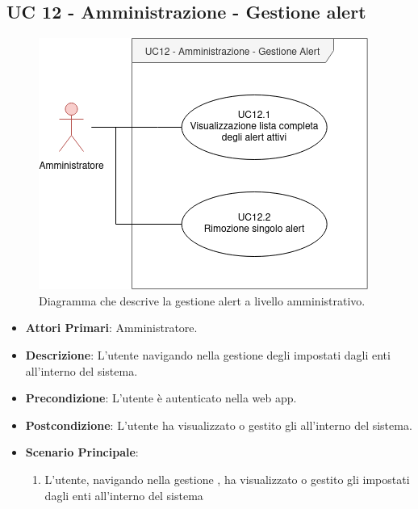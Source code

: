 	\subsection{UC 12 - Amministrazione - Gestione alert}

		\begin{figure}[H]
			\centering
			\includegraphics[scale=0.60]{res/images/uc12}
			\caption{Diagramma che descrive la gestione alert a livello amministrativo.}
		\end{figure}

		\begin{itemize}
			\item \textbf{Attori Primari}: Amministratore.
			\item \textbf{Descrizione}: L'utente navigando nella gestione degli  impostati dagli enti all'interno del sistema.
			\item \textbf{Precondizione}: L'utente è autenticato nella web app.
			\item \textbf{Postcondizione}: L'utente ha visualizzato o gestito gli  all'interno del sistema.
			\item \textbf{Scenario Principale}:
			\begin{enumerate}
				\item{L'utente, navigando nella gestione , ha visualizzato o gestito gli  impostati dagli enti all'interno del sistema}
			\end{enumerate}	
		\end{itemize}

